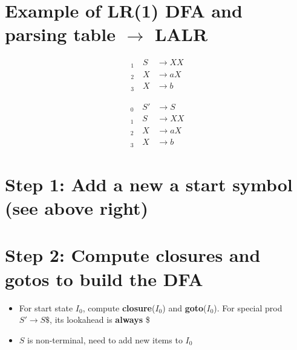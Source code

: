 \documentclass[10pt,a4paper,landscape]{article}
\begin{document}
\pagestyle{empty}
\begin{multicols*}{3}
% 
% 

\section*{Example of LR(1) DFA and parsing table $\to$ LALR}
\begin{minipage}{.5\linewidth}
\begin{align*}
  _1\quad S&\to XX \\
  _2\quad X&\to aX \\
  _3\quad X&\to b
\end{align*}
\end{minipage}
\begin{minipage}{.5\linewidth}
\begin{align*}
  _0\quad S'&\to S \\
  _1\quad S&\to XX \\
  _2\quad X&\to aX \\
  _3\quad X&\to b
\end{align*}
\end{minipage}
\section*{Step 1: Add a new a start symbol (see above right)}
\section*{Step 2: Compute closures and gotos to build the DFA}
\begin{itemize}
\item For start state $I_0$, compute \textbf{closure}($I_0$) and \textbf{goto}($I_0$). For special prod $S'\to S\$$, its lookahead is \textbf{always} \$
\begin{minipage}{\linewidth}
  \centering
\end{minipage}
\item $S$ is non-terminal, need to add new items to $I_0$


\end{itemize}
\end{multicols*}
\end{document}
